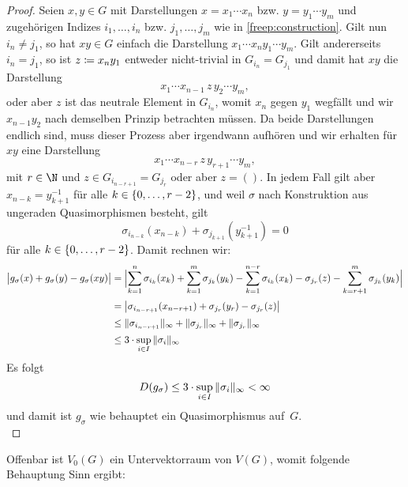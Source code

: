 \begin{proof}
    Seien $x,y\in G$ mit Darstellungen $x = x_1\cdots x_n$ bzw.
    $y = y_1\cdots y_m$ und zugehörigen Indizes $i_1,\ldots,i_n$ bzw.
    $j_1,\ldots,j_m$ wie in \cref{freep:construction}. Gilt nun $i_n \neq j_1$,
    so hat $xy\in G$ einfach die Darstellung $x_1\cdots x_n y_1\cdots y_m$.
    Gilt andererseits $i_n = j_1$, so ist $z \defeq x_ny_1$ entweder
    nicht-trivial in $G_{i_n} = G_{j_1}$ und damit hat $xy$ die Darstellung
    \[ x_1\cdots x_{n-1} \, z \, y_2\cdots y_m  , \]
    oder aber $z$ ist das neutrale Element in $G_{i_n}$, womit $x_n$ gegen
    $y_1$ wegfällt und wir $x_{n-1} y_2$ nach demselben Prinzip betrachten
    müssen. Da beide Darstellungen endlich sind, muss dieser Prozess aber
    irgendwann aufhören und wir erhalten für $xy$ eine Darstellung
    \[ x_1\cdots x_{n-r} \, z \, y_{r+1}\cdots y_m  , \]
    mit $r\in\N$ und $z\in G_{i_{n-r+1}} = G_{j_r}$ oder aber $z=()$.
    In jedem Fall gilt aber $x_{n-k} = y_{k+1}^{-1}$ für alle
    $k\in\setZeroto{r-2}$, und weil $\sigma$ nach Konstruktion aus ungeraden
    Quasimorphismen besteht, gilt
    \[ \sigma_{i_{n-k}}(x_{n-k}) + \sigma_{j_{k+1}}(y_{k+1}^{-1}) = 0 \]
    für alle $k\in\setZeroto{r-2}$. Damit rechnen wir:
    \begin{align*}
        \abs[\big]{ g_\sigma(x) + g_\sigma(y) - g_\sigma(xy) }
        &= \abs[\Big]{
                \ksum^n \sigma_{i_k}(x_k) + \ksum^m \sigma_{j_k}(y_k)
                - \ksum^{n-r} \sigma_{i_k}(x_k)
                - \sigma_{j_r}(z)
                - \ksum[r+1]^m \sigma_{j_k}(y_k)
            }
        \\[0.5ex]
        &= \abs[\big]{
            \sigma_{i_{n-r+1}}(x_{n-r+1})
            + \sigma_{j_r}(y_r)
            - \sigma_{j_r}(z)
            }
        \\[0.5ex]
        &\leq \norm{\sigma_{i_{n-r+1}}}_\supr
            + \norm{\sigma_{j_r}}_\supr
            + \norm{\sigma_{j_r}}_\supr
        \\[0.5ex]
        &\leq 3\cdot\sup_{i\in I}\, \norm{\sigma_i}_\supr
    \end{align*}
    Es folgt
    \[ D(g_\sigma) \leq 3\cdot\sup_{i\in I}\, \norm{\sigma_i}_\supr < \infty \]
    und damit ist $g_\sigma$ wie behauptet ein Quasimorphismus auf~$G$.
    \\
\end{proof}

Offenbar ist $V_0(G)$ ein Untervektorraum von $V(G)$, womit folgende Behauptung
Sinn ergibt:

